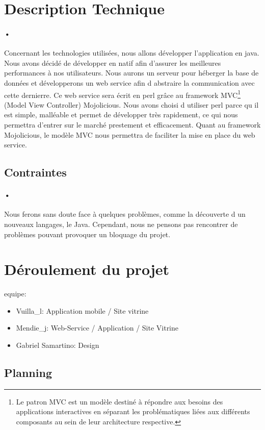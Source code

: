\documentclass[pdftex,12pt,a4paper]{article}
\begin{document}
\section{Description Technique}
\paragraph{•}
Concernant les technologies utilis\'ees, nous allons d\'evelopper l'application en java. Nous avons d\'ecid\'e de d\'evelopper en natif afin d'assurer les meilleures performances à nos utilisateurs.
Nous aurons un serveur pour h\'eberger la base de donn\'ees et d\'evelopperons un web service afin d abstraire la communication avec cette dernierre. Ce web service sera \'ecrit en perl gr\^ace au framework MVC\footnote{ Le patron MVC est un mod\`ele destin\'e \`a r\'epondre aux besoins des applications interactives en s\'eparant les probl\'ematiques li\'ees aux diff\'erents composants au sein de leur architecture respective.} (Model View Controller) Mojolicious. Nous avons choisi d utiliser perl parce qu il est simple, mall\'eable et permet de développer tr\`es rapidement, ce qui nous permettra d’entrer sur le march\'e prestement et efficacement. 
Quant au framework Mojolicious, le mod\`ele MVC nous permettra de faciliter la mise en place du web service.

\subsection{Contraintes}
\paragraph{•}
Nous ferons sans doute face \`a quelques probl\`emes, comme la d\'ecouverte d un nouveaux langages, le Java. Cependant, nous ne pensons pas rencontrer de probl\`emes pouvant provoquer un bloquage du projet.

\section{D\'eroulement du projet}
equipe:
\begin{itemize}
\item Vuilla\_l: Application mobile / Site vitrine
\item Mendie\_j: Web-Service / Application / Site Vitrine
\item Gabriel Samartino: Design
\end{itemize}

\subsection{Planning}
\end{document}
